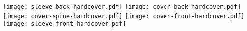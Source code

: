 \documentclass[border=0pt]{standalone}
\begin{document}
%
\noindent%
%
  \texttt{[image: sleeve-back-hardcover.pdf]}%
  \texttt{[image: cover-back-hardcover.pdf]}%
  \texttt{[image: cover-spine-hardcover.pdf]}%
  \texttt{[image: cover-front-hardcover.pdf]}%
  \texttt{[image: sleeve-front-hardcover.pdf]}%
\end{document}
